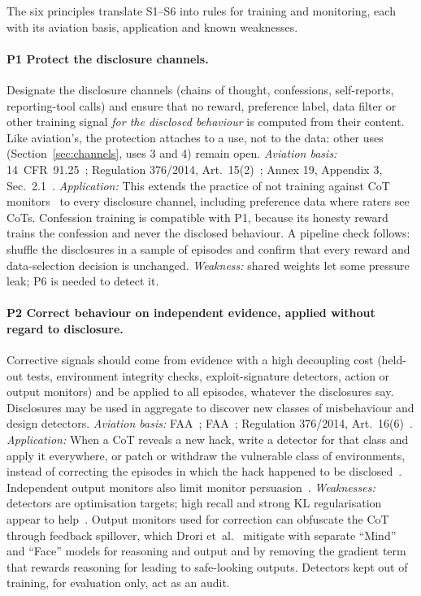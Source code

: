 \documentclass[11pt]{article}
\begin{document}
The six principles translate S1--S6 into rules for training and monitoring, each with its aviation basis, application and known weaknesses.

\paragraph{P1 Protect the disclosure channels.} Designate the disclosure channels (chains of thought, confessions, self-reports, reporting-tool calls) and ensure that no reward, preference label, data filter or other training signal \emph{for the disclosed behaviour} is computed from their content. Like aviation's, the protection attaches to a use, not to the data: other uses (Section~\ref{sec:channels}, uses 3 and 4) remain open. \emph{Aviation basis:} 14~CFR~91.25~\cite{cfr9125}; Regulation 376/2014, Art.~15(2)~\cite{eu376}; Annex 19, Appendix 3, Sec.~2.1~\cite{icao2016}. \emph{Application:} This extends the practice of not training against CoT monitors~\cite{baker2025,wagner2025} to every disclosure channel, including preference data where raters see CoTs. Confession training is compatible with P1, because its honesty reward trains the confession and never the disclosed behaviour. A pipeline check follows: shuffle the disclosures in a sample of episodes and confirm that every reward and data-selection decision is unchanged. \emph{Weakness:} shared weights let some pressure leak; P6 is needed to detect it.

\paragraph{P2 Correct behaviour on independent evidence, applied without regard to disclosure.} Corrective signals should come from evidence with a high decoupling cost (held-out tests, environment integrity checks, exploit-signature detectors, action or output monitors) and be applied to all episodes, whatever the disclosures say. Disclosures may be used in aggregate to discover new classes of misbehaviour and design detectors. \emph{Aviation basis:} FAA~\cite[para.~8.3]{faa2021}; FAA~\cite[para.~16.4]{faa2020}; Regulation 376/2014, Art.~16(6)~\cite{eu376}. \emph{Application:} When a CoT reveals a new hack, write a detector for that class and apply it everywhere, or patch or withdraw the vulnerable class of environments, instead of correcting the episodes in which the hack happened to be disclosed~\cite[Sec.~5.2]{baker2025}. Independent output monitors also limit monitor persuasion~\cite{wagner2025}. \emph{Weaknesses:} detectors are optimisation targets; high recall and strong KL regularisation appear to help~\cite{cundy2025,taufeeque2026}. Output monitors used for correction can obfuscate the CoT through feedback spillover, which Drori et~al.~\cite{drori2025} mitigate with separate ``Mind'' and ``Face'' models for reasoning and output and by removing the gradient term that rewards reasoning for leading to safe-looking outputs. Detectors kept out of training, for evaluation only, act as an audit.
\end{document}
